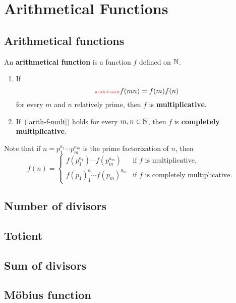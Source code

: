 \chapter{Arithmetical Functions}
\section{Arithmetical functions}
\begin{df}
An \textbf{arithmetical function} is a function $f$ defined on $\mathbb{N}$. \begin{enumerate}
\item
If
\begin{equation}\llabel{arith-f-mult}
f(mn)=f(m)f(n)
\end{equation}
for every $m$ and $n$ relatively prime, then $f$ is \textbf{multiplicative}.
\item 
If~(\ref{arith-f-mult}) holds for every $m,n\in \mathbb{N}$, then $f$ is \textbf{completely multiplicative}.
\end{enumerate}
\end{df}
Note that if $n=p_1^{a_1}\cdots p_m^{a_m}$ is the prime factorization of $n$, then
\[
f(n)=\begin{cases}
f(p_1^{a_1})\cdots f(p_m^{a_m})&\text{if }f \text{ is multiplicative,}\\
f(p_1)^a_1\cdots f(p_m)^{a_m}&\text{if }f\text{ is  completely multiplicative}.
\end{cases}
\]
\section{Number of divisors}
\section{Totient}
\section{Sum of divisors}
\section{M\"obius function}
